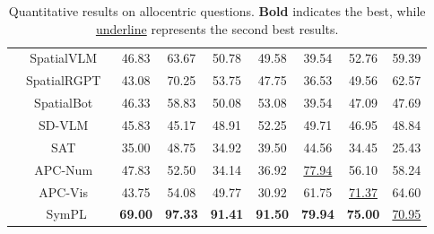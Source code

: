 \begin{table}[!t]
{\begin{tabular}{c|c|cccc|ccc}
& SpatialVLM~\cite{sr_spatialvlm}                   & 46.83 & 63.67 & 50.78 & 49.58 & 39.54 & 52.76 & 59.39 \\
& SpatialRGPT~\cite{sr_spatialrgpt}                 & 43.08 & 70.25 & 53.75 & 47.75 & 36.53 & 49.56 & 62.57 \\
& SpatialBot~\cite{sr_spatialbot}                   & 46.33 & 58.83 & 50.08 & 53.08 & 39.54 & 47.09 & 47.69 \\
& SD-VLM~\cite{sr_sdvlm}                            & 45.83 & 45.17 & 48.91 & 52.25 & 49.71 & 46.95 & 48.84 \\
\midrule
{}
& SAT~\cite{par_sat}                                & 35.00 & 48.75 & 34.92 & 39.50 & 44.56 & 34.45    & 25.43 \\
& APC-Num~\cite{par_apc}                            & 47.83 & 52.50 & 34.14 & 36.92 & \underline{77.94} & 56.10 & 58.24 \\
& APC-Vis~\cite{par_apc}                            & 43.75 & 54.08 & 49.77 & 30.92 & 61.75 & \underline{71.37} & 64.60 \\
\midrule
{}
&  SymPL & \textbf{69.00} & \textbf{97.33} & \textbf{91.41} & \textbf{91.50} & \textbf{79.94} & \textbf{75.00} & \underline{70.95} \\
\bottomrule
\end{tabular}%
}
\caption{Quantitative results on allocentric questions. \textbf{Bold} indicates the best, while \underline{underline} represents the second best results.}
\label{tab:main_res}
\vspace{-4mm}
\end{table}
